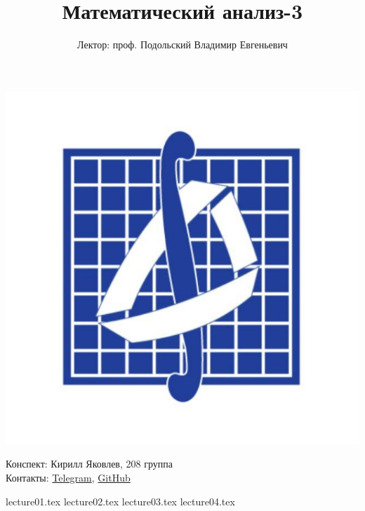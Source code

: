 \documentclass[a4paper, 12pt]{article}
\title{\textbf{Математический анализ-3}}
\author{Лектор: проф. Подольский Владимир Евгеньевич}
\begin{document}
    
\fontsize{14pt}{20pt}\selectfont
\maketitle
\vspace{0.3cm}
\begin{center}
    \includegraphics[width=0.75\linewidth]{Images/mehmat.png}
\end{center}
\vspace{1.5cm}
\begin{center}
    Конспект: Кирилл Яковлев, 208 группа\\
    Контакты: \href{https://t.me/fourkenz}{Telegram}, \href{https://github.com/yakovlevki}{GitHub}\\
\end{center}
    
\newpage
\tableofcontents
\newpage

{lecture01.tex}
{lecture02.tex}
{lecture03.tex}
{lecture04.tex}
\end{document}

